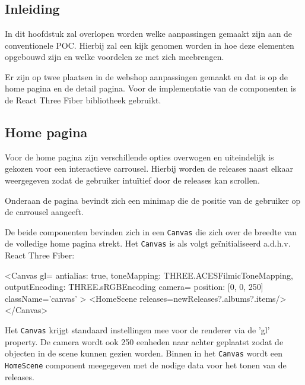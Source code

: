 
\chapter{}%
\label{ch:proofofconceptThreeJS}

\section{Inleiding}

In dit hoofdstuk zal overlopen worden welke aanpassingen gemaakt zijn aan de conventionele POC. Hierbij zal een kijk genomen worden in hoe deze elementen opgebouwd zijn en welke voordelen ze met zich meebrengen.

Er zijn op twee plaatsen in de webshop aanpassingen gemaakt en dat is op de home pagina en de detail pagina. Voor de implementatie van de componenten is de React Three Fiber bibliotheek gebruikt.

\section{Home pagina}

Voor de home pagina zijn verschillende opties overwogen en uiteindelijk is gekozen voor een interactieve carrousel. Hierbij worden de releases naast elkaar weergegeven zodat de gebruiker intuïtief door de releases kan scrollen.

Onderaan de pagina bevindt zich een minimap die de positie van de gebruiker op de carrousel aangeeft.

De beide componenten bevinden zich in een \texttt{Canvas} die zich over de breedte van de volledige home pagina strekt. Het \texttt{Canvas} is als volgt geïnitialiseerd a.d.h.v. React Three Fiber: 

\newpage

\begin{LVerbatim}
<Canvas
	gl={{
			antialias: true,
			toneMapping: THREE.ACESFilmicToneMapping,
			outputEncoding: THREE.sRGBEncoding
	}}
	camera={{ position: [0, 0, 250] }}
	className='canvas'
>
	<HomeScene releases={newReleases?.albums?.items}/>
</Canvas>
\end{LVerbatim}

Het \texttt{Canvas} krijgt standaard instellingen mee voor de renderer via de 'gl' property. De camera wordt ook 250 eenheden naar achter geplaatst zodat de objecten in de scene kunnen gezien worden. Binnen in het \texttt{Canvas} wordt een \texttt{HomeScene} component meegegeven met de nodige data voor het tonen van de releases.


